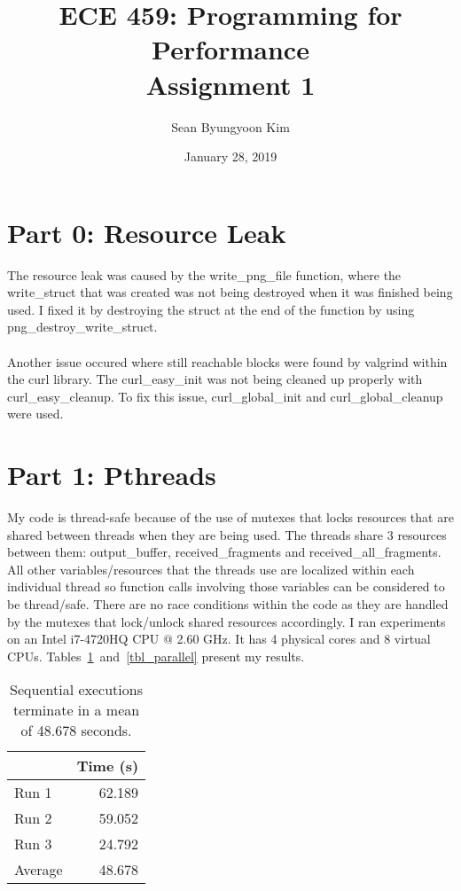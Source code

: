 \documentclass[12pt]{article}
\title{ECE 459: Programming for Performance\\Assignment 1}
\author{Sean Byungyoon Kim}
\date{January 28, 2019}
\newcommand{\physicalcores}{4}
\newcommand{\virtualcpus}{8}
\begin{document}
\maketitle

\section*{Part 0: Resource Leak}

The resource leak was caused by the write\_png\_file function, where the write\_struct that was created was not being destroyed when it was finished being used. I fixed it by destroying the struct at the end of the function by using png\_destroy\_write\_struct. \\
\\
Another issue occured where still reachable blocks were found by valgrind within the curl library. The curl\_easy\_init was not being cleaned up properly with curl\_easy\_cleanup. To fix this issue, curl\_global\_init and curl\_global\_cleanup were used. 

\section*{Part 1: Pthreads}

My code is thread-safe because of the use of mutexes that locks resources that are shared between threads when they are being used. The threads share 3 resources between them: output\_buffer, received\_fragments and received\_all\_fragments. All other variables/resources that the threads use are localized within each individual thread so function calls involving those variables can be considered to be thread/safe. There are no race conditions within the code as they are handled by the mutexes that lock/unlock shared resources accordingly. I ran experiments on an Intel i7-4720HQ CPU @ 2.60 GHz. It has \physicalcores{} physical cores and \virtualcpus{} virtual
CPUs. Tables~\ref{tbl_sequential}~and~\ref{tbl_parallel} present my results.

\begin{table}[H]
  \centering
  \begin{tabular}{lr}
    & {\bf Time (s)} \\
    \hline
    Run 1 & 62.189 \\
    Run 2 & 59.052 \\
    Run 3 & 24.792 \\
    \hline
    Average & 48.678 \\
  \end{tabular}
  \caption{\label{tbl_sequential}Sequential executions terminate in a mean of 48.678 seconds.}
\end{table}
\end{document}

